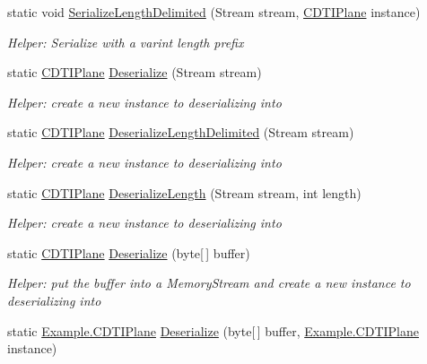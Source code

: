 \begin{DoxyCompactItemize}
static void \hyperlink{class_example_1_1_c_d_t_i_plane_a861c8211cc2b5f3bcaf3721dff13435c}{Serialize\+Length\+Delimited} (Stream stream, \hyperlink{class_example_1_1_c_d_t_i_plane}{C\+D\+T\+I\+Plane} instance)
\begin{DoxyCompactList}\small\item\em Helper\+: Serialize with a varint length prefix\end{DoxyCompactList}\item 
static \hyperlink{class_example_1_1_c_d_t_i_plane}{C\+D\+T\+I\+Plane} \hyperlink{class_example_1_1_c_d_t_i_plane_a9b57535386fd8416a21329193c1d4a8d}{Deserialize} (Stream stream)
\begin{DoxyCompactList}\small\item\em Helper\+: create a new instance to deserializing into\end{DoxyCompactList}\item 
static \hyperlink{class_example_1_1_c_d_t_i_plane}{C\+D\+T\+I\+Plane} \hyperlink{class_example_1_1_c_d_t_i_plane_a2a402540634e3e86a57af48860920f8c}{Deserialize\+Length\+Delimited} (Stream stream)
\begin{DoxyCompactList}\small\item\em Helper\+: create a new instance to deserializing into\end{DoxyCompactList}\item 
static \hyperlink{class_example_1_1_c_d_t_i_plane}{C\+D\+T\+I\+Plane} \hyperlink{class_example_1_1_c_d_t_i_plane_a60c2ac4412417d21c958f98f90424487}{Deserialize\+Length} (Stream stream, int length)
\begin{DoxyCompactList}\small\item\em Helper\+: create a new instance to deserializing into\end{DoxyCompactList}\item 
static \hyperlink{class_example_1_1_c_d_t_i_plane}{C\+D\+T\+I\+Plane} \hyperlink{class_example_1_1_c_d_t_i_plane_a4df1a00746b2efa5d9ecbea4a978ef6e}{Deserialize} (byte\mbox{[}$\,$\mbox{]} buffer)
\begin{DoxyCompactList}\small\item\em Helper\+: put the buffer into a Memory\+Stream and create a new instance to deserializing into\end{DoxyCompactList}\item 
static \hyperlink{class_example_1_1_c_d_t_i_plane}{Example.\+C\+D\+T\+I\+Plane} \hyperlink{class_example_1_1_c_d_t_i_plane_a82f32570c03dea0189e0f31acb7f8d0c}{Deserialize} (byte\mbox{[}$\,$\mbox{]} buffer, \hyperlink{class_example_1_1_c_d_t_i_plane}{Example.\+C\+D\+T\+I\+Plane} instance)

\end{DoxyCompactItemize}
